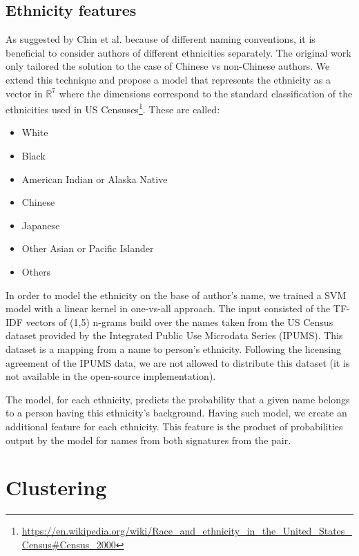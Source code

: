 \documentclass{pracamgr}
\begin{document}
\subsection{Ethnicity features}

As suggested by Chin et al. \citep{chin14a} because of different naming
conventions, it is beneficial to consider authors of different ethnicities
separately. The original work only tailored the solution to the case of Chinese
vs non-Chinese authors. We extend this technique and propose a model that represents the 
ethnicity as a vector in $\mathbb{R}^7$ where the dimensions correspond to the standard
classification of the ethnicities used in US Censuses\footnote{\href{https://en.wikipedia.org/wiki/Race\_and\_ethnicity\_in\_the\_United\_States\_Census\#Census\_2000}{https://en.wikipedia.org/wiki/Race\_and\_ethnicity\_in\_the\_United\_States\_Census\#Census\_2000}}. These are called:

\begin{itemize}
\item{White}
\item{Black}
\item{American Indian or Alaska Native}
\item{Chinese}
\item{Japanese}
\item{Other Asian or Pacific Islander}
\item{Others}
\end{itemize}

In order to model the ethnicity on the base of author's name, we trained a
SVM model with a linear kernel in one-vs-all approach. The input consisted of the TF-IDF
vectors of (1,5) n-grams build over the names taken from the US Census dataset provided by 
the Integrated Public Use Microdata Series (IPUMS). This dataset is a mapping from a name
to person's ethnicity. Following the licensing agreement of the IPUMS data, we are not
allowed to distribute this dataset (it is not available in the open-source
implementation).

The model, for each ethnicity, predicts the probability that a given name belongs
to a person having this ethnicity's background. Having such model, we create an
additional feature for each ethnicity. This feature is the product of probabilities
output by the model for names from both signatures from the pair.

\section{Clustering}
\end{document}
